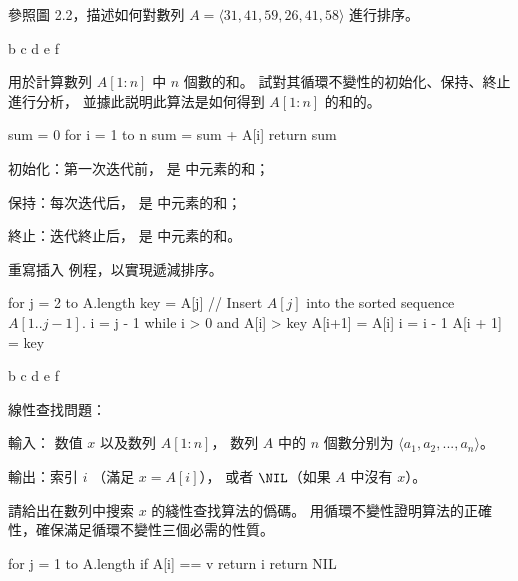 \startsection[
  title={Insertion sort},
]

\startEXERCISE
參照圖 2.2，描述如何對數列 $A = \langle 31, 41, 59, 26, 41, 58\rangle$ 進行排序。
\stopEXERCISE

\startANSWER
{}
{\externalfigure[output/e2_1_1-2]}{b}
{\externalfigure[output/e2_1_1-3]}{c}
{\externalfigure[output/e2_1_1-4]}{d}
{\externalfigure[output/e2_1_1-5]}{e}
{\externalfigure[output/e2_1_1-6]}{f}
\stopcombination
\stopANSWER

\startEXERCISE
{} 用於計算數列 $A[1:n]$ 中 $n$ 個數的和。
試對其循環不變性的初始化、保持、終止進行分析，
並據此説明此算法是如何得到 $A[1:n]$ 的和的。

\startCLRSCODE
sum = 0
for i = 1 to n
	sum = sum + A[i]
return sum
\stopCLRSCODE
\stopEXERCISE

\startANSWER
\startigBase
\item 初始化：第一次迭代前，  是  中元素的和；
\item 保持：每次迭代后，  是  中元素的和；
\item 終止：迭代終止后，  是  中元素的和。
\stopigBase
\stopANSWER

\startEXERCISE
重寫插入 例程，以實現遞減排序。
\stopEXERCISE
\startANSWER

\startCLRSCODE
for j = 2 to A.length
	key = A[j]
	// Insert $A[j]$ into the sorted sequence $A[1 .. j-1]$.
	i = j - 1
	while i > 0 and A[i] > key
		A[i+1] = A[i]
		i = i - 1
	A[i + 1] = key
\stopCLRSCODE

{\externalfigure[output/e2_1_2-2]}{b}
{\externalfigure[output/e2_1_2-3]}{c}
{\externalfigure[output/e2_1_2-4]}{d}
{\externalfigure[output/e2_1_2-5]}{e}
{\externalfigure[output/e2_1_2-6]}{f}
\stopcombination
\stopANSWER

線性查找問題：

輸入： 数值 $x$ 以及数列 $A[1:n]$，
数列 $A$ 中的 $n$ 個數分别为 $\langle a_1, a_2, ..., a_n \rangle$。

輸出：索引 $i$ （滿足 $x = A[i]$），
或者 $\NIL$（如果 $A$ 中沒有 $x$）。

請給出在數列中搜索 $x$ 的綫性查找算法的僞碼。
用循環不變性證明算法的正確性，確保滿足循環不變性三個必需的性質。
\stopEXERCISE

\startANSWER
\startCLRSCODE
for j = 1 to A.length
	if A[i] == v
		return i
return NIL
\stopCLRSCODE
\stopANSWER


